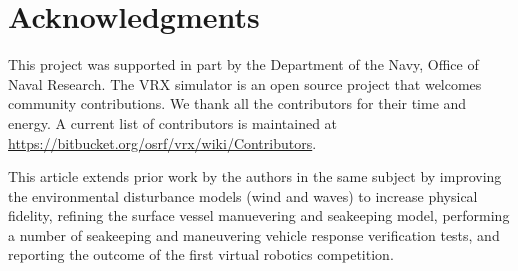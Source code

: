 \documentclass[utf8]{frontiersSCNS} %
\begin{document}

\section*{Acknowledgments}
This project was supported in part by the Department of the Navy, Office of Naval Research.  The VRX simulator is an open source project that welcomes community contributions.  We thank all the contributors for their time and energy.  A current list of contributors is maintained at \url{https://bitbucket.org/osrf/vrx/wiki/Contributors}.

This article extends prior work by the authors in the same subject \citep{bingham19toward} by improving the environmental disturbance models (wind and waves) to increase physical fidelity, refining the surface vessel manuevering and seakeeping model, \color{red} performing a number of seakeeping and maneuvering vehicle response verification tests,\color{black} and reporting the outcome of the first virtual robotics competition.

 

\end{document}
